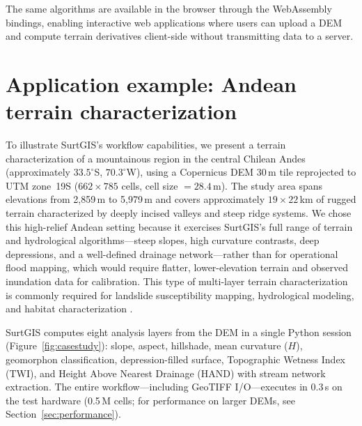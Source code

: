 \documentclass[preprint,review,12pt,authoryear]{elsarticle}
\begin{document}
The same algorithms are available in the browser through the WebAssembly bindings, enabling interactive web applications where users can upload a DEM and compute terrain derivatives client-side without transmitting data to a server.

\section{Application example: Andean terrain characterization}
\label{sec:casestudy}

To illustrate SurtGIS's workflow capabilities, we present a terrain characterization of a mountainous region in the central Chilean Andes (approximately $33.5^{\circ}$S, $70.3^{\circ}$W), using a Copernicus DEM 30\,m tile reprojected to UTM zone~19S ($662 \times 785$ cells, cell size $= 28.4$\,m). The study area spans elevations from 2{,}859\,m to 5{,}979\,m and covers approximately $19 \times 22$\,km of rugged terrain characterized by deeply incised valleys and steep ridge systems. We chose this high-relief Andean setting because it exercises SurtGIS's full range of terrain and hydrological algorithms---steep slopes, high curvature contrasts, deep depressions, and a well-defined drainage network---rather than for operational flood mapping, which would require flatter, lower-elevation terrain and observed inundation data for calibration. This type of multi-layer terrain characterization is commonly required for landslide susceptibility mapping, hydrological modeling, and habitat characterization \citep{amatulli2018}.

SurtGIS computes eight analysis layers from the DEM in a single Python session (Figure~\ref{fig:casestudy}): slope, aspect, hillshade, mean curvature ($H$), geomorphon classification, depression-filled surface, Topographic Wetness Index (TWI), and Height Above Nearest Drainage (HAND) with stream network extraction. The entire workflow---including GeoTIFF I/O---executes in 0.3\,s on the test hardware (0.5\,M cells; for performance on larger DEMs, see Section~\ref{sec:performance}).
\end{document}
